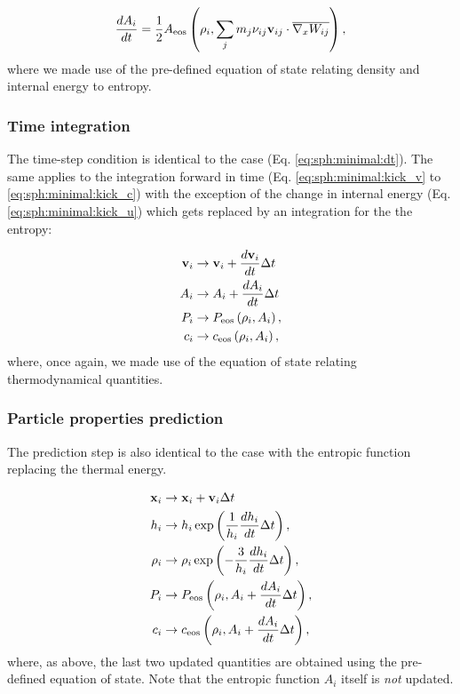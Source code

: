 \begin{equation}
\frac{dA_i}{dt} = \frac{1}{2} A_{\rm eos}\left(\rho_i, \sum_j
m_j \nu_{ij}\vec{v}_{ij}\cdot \Wij\right),
\end{equation}
where we made use of the pre-defined equation of state relating
density and internal energy to entropy.

\subsubsection{Time integration}

The time-step condition is identical to the \MinimalSPH case
(Eq. \ref{eq:sph:minimal:dt}). The same applies to the integration
forward in time (Eq. \ref{eq:sph:minimal:kick_v} to
\ref{eq:sph:minimal:kick_c}) with the exception of the change in
internal energy (Eq. \ref{eq:sph:minimal:kick_u}) which gets replaced
by an integration for the the entropy:


\begin{align}
  \vec{v}_i &\rightarrow \vec{v}_i + \frac{d\vec{v}_i}{dt} \Delta t  \label{eq:sph:gadget2:kick_v}\\
  A_i &\rightarrow A_i + \frac{dA_i}{dt} \Delta t \label{eq:sph:gadget2:kick_A}\\
  P_i &\rightarrow P_{\rm eos}\left(\rho_i, A_i\right) \label{eq:sph:gadget2:kick_P}, \\
  c_i &\rightarrow c_{\rm eos}\left(\rho_i, A_i\right) \label{eq:sph:gadget2:kick_c},
\end{align}
where, once again, we made use of the equation of state relating
thermodynamical quantities.

\subsubsection{Particle properties prediction}

The prediction step is also identical to the \MinimalSPH case with the
entropic function replacing the thermal energy.

\begin{align}
  \vec{x}_i &\rightarrow \vec{x}_i + \vec{v}_i \Delta t  \label{eq:sph:gadget2:drift_x} \\
  h_i &\rightarrow h_i \exp\left(\frac{1}{h_i} \frac{dh_i}{dt}
  \Delta t\right), \label{eq:sph:gadget2:drift_h}\\
  \rho_i &\rightarrow \rho_i \exp\left(-\frac{3}{h_i} \frac{dh_i}{dt}
  \Delta t\right), \label{eq:sph:gadget2:drift_rho} \\
  P_i &\rightarrow P_{\rm eos}\left(\rho_i, A_i + \frac{dA_i}{dt} \Delta t\right), \label{eq:sph:gadget2:drift_P}\\
  c_i &\rightarrow c_{\rm eos}\left(\rho_i, A_i + \frac{dA_i}{dt}
  \Delta t\right) \label{eq:sph:gadget2:drift_c},
\end{align}
where, as above, the last two updated quantities are obtained using
the pre-defined equation of state. Note that the entropic function $A_i$
itself is \emph{not} updated.


